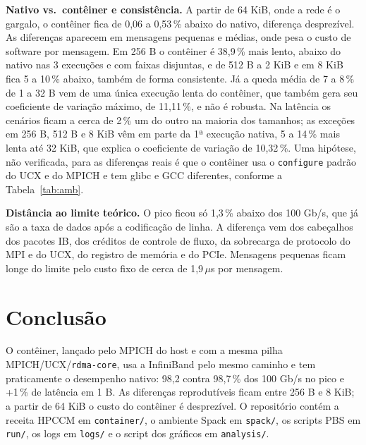 \documentclass[Portugues]{ic-tese-v3}
\begin{document}
\textbf{Nativo vs.\ contêiner e consistência.} A partir de 64 KiB, onde a rede é o gargalo, o contêiner fica de 0,06 a 0,53\,\% abaixo do nativo, diferença desprezível. As diferenças aparecem em mensagens pequenas e médias, onde pesa o custo de software por mensagem. Em 256 B o contêiner é 38,9\,\% mais lento, abaixo do nativo nas 3 execuções e com faixas disjuntas, e de 512 B a 2 KiB e em 8 KiB fica 5 a 10\,\% abaixo, também de forma consistente. Já a queda média de 7 a 8\,\% de 1 a 32 B vem de uma única execução lenta do contêiner, que também gera seu coeficiente de variação máximo, de 11,11\,\%, e não é robusta. Na latência os cenários ficam a cerca de 2\,\% um do outro na maioria dos tamanhos; as exceções em 256 B, 512 B e 8 KiB vêm em parte da 1ª execução nativa, 5 a 14\,\% mais lenta até 32 KiB, que explica o coeficiente de variação de 10,32\,\%. Uma hipótese, não verificada, para as diferenças reais é que o contêiner usa o \texttt{configure} padrão do UCX e do MPICH e tem glibc e GCC diferentes, conforme a Tabela~\ref{tab:amb}.

\textbf{Distância ao limite teórico.} O pico ficou só 1,3\,\% abaixo dos 100 Gb/s, que já são a taxa de dados após a codificação de linha. A diferença vem dos cabeçalhos dos pacotes IB, dos créditos de controle de fluxo, da sobrecarga de protocolo do MPI e do UCX, do registro de memória e do PCIe. Mensagens pequenas ficam longe do limite pelo custo fixo de cerca de 1,9\,$\mu$s por mensagem.

\section{Conclusão}
O contêiner, lançado pelo MPICH do host e com a mesma pilha MPICH/UCX/\texttt{rdma-core}, usa a InfiniBand pelo mesmo caminho e tem praticamente o desempenho nativo: 98,2 contra 98,7\,\% dos 100 Gb/s no pico e +1\,\% de latência em 1 B. As diferenças reprodutíveis ficam entre 256 B e 8 KiB; a partir de 64 KiB o custo do contêiner é desprezível. O repositório contém a receita HPCCM em \texttt{container/}, o ambiente Spack em \texttt{spack/}, os scripts PBS em \texttt{run/}, os logs em \texttt{logs/} e o script dos gráficos em \texttt{analysis/}.
\end{document}
